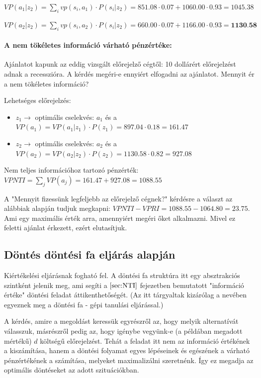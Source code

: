 \documentclass[a4paper,12pt]{article}
\begin{document}
$VP(a_1|z_2) = \sum_{i}vp(s_i,a_1)\cdot P(s_i|z_2) = 851.08\cdot 0.07 + 1060.00\cdot 0.93 = 1045.38$

$VP(a_2|z_2) = \sum_{i}vp(s_i,a_2)\cdot P(s_i|z_2) = 660.00\cdot 0.07 + 1166.00\cdot 0.93 = \textbf{1130.58}$

\paragraph{A nem tökéletes információ várható pénzértéke: }

Ajánlatot kapunk az eddig vizsgált előrejelző cégtől: 10 dollárért előrejelzést adnak a recesszióra.
A kérdés megéri-e ennyiért elfogadni az ajánlatot.
Mennyit ér a nem tökéletes információ?

Lehetséges előrejelzés:
\begin{itemize}
\item $z_{1} \rightarrow$ optimális cselekvés: $a_1$  és a $VP(a_1) = VP(a_1|z_1) \cdot  P(z_1) = 897.04\cdot 0.18 = 161.47$
\item $z_{2} \rightarrow$ optimális cselekvés: $a_2$  és a $VP(a_2) = VP(a_2|z_2) \cdot  P(z_2) = 1130.58\cdot 0.82 = 927.08$
\end{itemize}

Nem teljes információhoz tartozó pénzérték: $VPNTI = \sum_{j} VP(a_j) = 161.47 + 927.08 = 1088.55$

A "Mennyit fizessünk legfeljebb az előrejelző cégnek?"
kérdésre a választ az alábbiak alapján tudjuk megkapni:
$VPNTI - VPRI = 1088.55 - 1064.80 = 23.75$.
Ami egy maximális érték arra, amennyiért megéri őket alkalmazni.
Mivel ez feletti ajánlat érkezett, ezért elutasítjuk.

\subsection{Döntés döntési fa eljárás alapján}

Kiértékelési eljárásnak fogható fel. A döntési fa struktúra itt egy absztrakciós szintként jelenik meg, ami segíti a $\ref{sec:NTI}$ fejezetben bemutatott "információ értéke" döntési feladat áttikenthetőségét. (Az itt tárgyaltak kizárólag a nevében egyeznek meg a döntési fa - gépi tanulási eljárással.)

A kérdés, amire a megoldást keressük egyrészről az, hogy melyik alternatívát válasszuk, másrészről pedig az, hogy igénybe vegyünk-e (a példában megadott mértékű) $d$ költségű előrejelzést. Tehát a feladat itt nem az információ értékének a kiszámítása, hanem a döntési folyamat egyes lépéseinek és egészének a várható pénzértékének a számítása, melyeket maximalizálni szeretnénk. Így ez megadja az optimális döntéseket az adott szituációkban.
\end{document}
